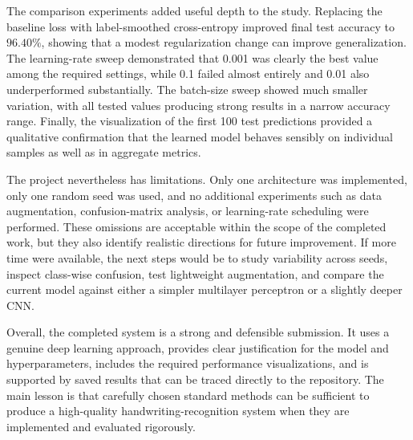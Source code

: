 \documentclass[conference]{IEEEtran}
\begin{document}
The comparison experiments added useful depth to the study. Replacing the baseline loss with label-smoothed cross-entropy improved final test accuracy to $96.40\%$, showing that a modest regularization change can improve generalization. The learning-rate sweep demonstrated that 0.001 was clearly the best value among the required settings, while 0.1 failed almost entirely and 0.01 also underperformed substantially. The batch-size sweep showed much smaller variation, with all tested values producing strong results in a narrow accuracy range. Finally, the visualization of the first 100 test predictions provided a qualitative confirmation that the learned model behaves sensibly on individual samples as well as in aggregate metrics.

The project nevertheless has limitations. Only one architecture was implemented, only one random seed was used, and no additional experiments such as data augmentation, confusion-matrix analysis, or learning-rate scheduling were performed. These omissions are acceptable within the scope of the completed work, but they also identify realistic directions for future improvement. If more time were available, the next steps would be to study variability across seeds, inspect class-wise confusion, test lightweight augmentation, and compare the current model against either a simpler multilayer perceptron or a slightly deeper CNN.

Overall, the completed system is a strong and defensible submission. It uses a genuine deep learning approach, provides clear justification for the model and hyperparameters, includes the required performance visualizations, and is supported by saved results that can be traced directly to the repository. The main lesson is that carefully chosen standard methods can be sufficient to produce a high-quality handwriting-recognition system when they are implemented and evaluated rigorously.
\end{document}
